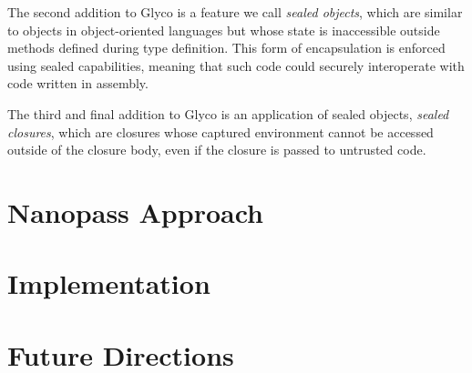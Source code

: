 \documentclass[main.tex]{subfiles}
\begin{document}
The second addition to Glyco is a feature we call \emph{sealed objects}, which are similar to objects in object-oriented languages but whose state is inaccessible outside methods defined during type definition. This form of encapsulation is enforced using sealed capabilities, meaning that such code could securely interoperate with code written in assembly.

The third and final addition to Glyco is an application of sealed objects, \emph{sealed closures}, which are closures whose captured environment cannot be accessed outside of the closure body, even if the closure is passed to untrusted code.

\section{Nanopass Approach}

\section{Implementation}

\section{Future Directions}


\biblio{}
\onlyinsubfile{\glsaddall\printglossaries}
\end{document}
